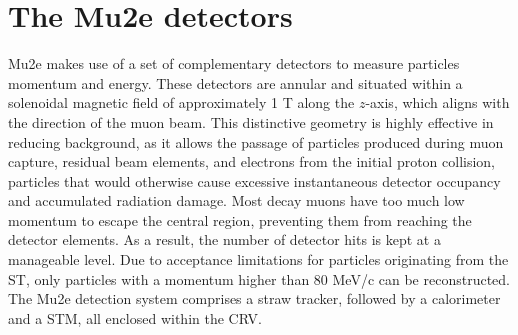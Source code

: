 \section{The Mu2e detectors}
Mu2e makes use of a set of complementary detectors to 
measure particles momentum and energy. These detectors 
are annular and situated within a solenoidal magnetic field of 
approximately 1 T along the $z$-axis, which aligns with 
the direction of the muon beam. This distinctive geometry 
is highly effective in reducing background, as it allows 
the passage of particles produced during muon capture, 
residual beam elements, and electrons from the initial proton collision, 
particles that would otherwise cause excessive instantaneous detector 
occupancy and accumulated radiation damage. Most decay muons have too much low momentum 
to escape the central region, preventing them from reaching the detector elements. 
As a result, the number of detector hits is kept at a manageable level. 
Due to acceptance limitations for particles originating from the ST, 
only particles with a momentum higher than 80 MeV/c can be reconstructed.
The Mu2e detection system comprises a straw tracker, followed by a 
calorimeter and a STM, all enclosed within the CRV.



